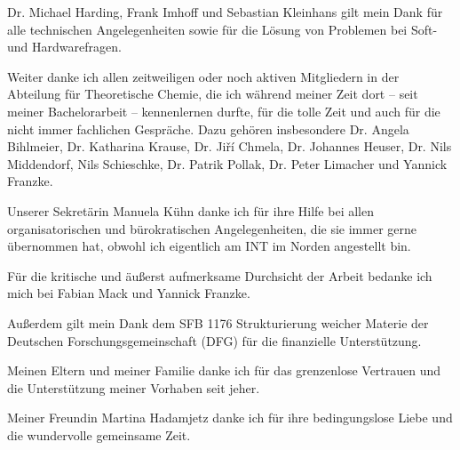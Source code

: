Dr. Michael Harding, Frank Imhoff und Sebastian Kleinhans gilt mein Dank für alle technischen Angelegenheiten sowie für die Lösung von Problemen bei Soft- und Hardwarefragen. 

Weiter danke ich allen zeitweiligen oder noch aktiven Mitgliedern in der Abteilung für Theoretische Chemie, die ich während meiner Zeit dort -- seit meiner Bachelorarbeit -- kennenlernen durfte, für die tolle Zeit und auch für die nicht immer fachlichen Gespräche. Dazu gehören insbesondere Dr. Angela Bihlmeier, Dr. Katharina Krause, Dr. Jiří Chmela, Dr. Johannes Heuser, Dr. Nils  Middendorf, Nils Schieschke, Dr. Patrik Pollak, Dr. Peter Limacher und Yannick Franzke.

Unserer Sekretärin Manuela Kühn danke ich für ihre Hilfe bei allen organisatorischen und bürokratischen Angelegenheiten, die sie immer gerne übernommen hat, obwohl ich eigentlich am INT im Norden angestellt bin.

\bigskip
Für die kritische und äußerst aufmerksame Durchsicht der Arbeit bedanke ich mich bei Fabian Mack und Yannick Franzke.

\bigskip
Außerdem gilt mein Dank dem SFB 1176 \glqq Strukturierung weicher Materie\grqq{} der Deutschen Forschungsgemeinschaft (DFG) für die finanzielle Unterstützung.

\bigskip
Meinen Eltern und meiner Familie danke ich für das grenzenlose Vertrauen und die Unterstützung meiner Vorhaben seit jeher. 

\bigskip
Meiner Freundin Martina Hadamjetz danke ich für ihre bedingungslose Liebe und die wundervolle gemeinsame Zeit. 
